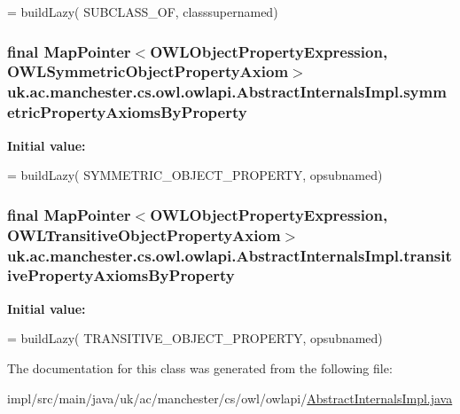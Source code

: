 \begin{DoxyCode}
= buildLazy(
            SUBCLASS\_OF, classsupernamed)
\end{DoxyCode}
\hypertarget{classuk_1_1ac_1_1manchester_1_1cs_1_1owl_1_1owlapi_1_1_abstract_internals_impl_a8a15718e35cef2f64037bd8c70ee3f4a}{
\subsubsection[{symmetric\-Property\-Axioms\-By\-Property}]{\setlength{\rightskip}{0pt plus 5cm}final Map\-Pointer$<${\bf O\-W\-L\-Object\-Property\-Expression}, {\bf O\-W\-L\-Symmetric\-Object\-Property\-Axiom}$>$ uk.\-ac.\-manchester.\-cs.\-owl.\-owlapi.\-Abstract\-Internals\-Impl.\-symmetric\-Property\-Axioms\-By\-Property\hspace{0.3cm}{\ttfamily [protected]}}}\label{classuk_1_1ac_1_1manchester_1_1cs_1_1owl_1_1owlapi_1_1_abstract_internals_impl_a8a15718e35cef2f64037bd8c70ee3f4a}
{\bfseries Initial value\-:}
\begin{DoxyCode}
= buildLazy(
            SYMMETRIC\_OBJECT\_PROPERTY, opsubnamed)
\end{DoxyCode}
\hypertarget{classuk_1_1ac_1_1manchester_1_1cs_1_1owl_1_1owlapi_1_1_abstract_internals_impl_a59538bd3e85bb3fb5433e47ed8e01a1a}{
\subsubsection[{transitive\-Property\-Axioms\-By\-Property}]{\setlength{\rightskip}{0pt plus 5cm}final Map\-Pointer$<${\bf O\-W\-L\-Object\-Property\-Expression}, {\bf O\-W\-L\-Transitive\-Object\-Property\-Axiom}$>$ uk.\-ac.\-manchester.\-cs.\-owl.\-owlapi.\-Abstract\-Internals\-Impl.\-transitive\-Property\-Axioms\-By\-Property\hspace{0.3cm}{\ttfamily [protected]}}}\label{classuk_1_1ac_1_1manchester_1_1cs_1_1owl_1_1owlapi_1_1_abstract_internals_impl_a59538bd3e85bb3fb5433e47ed8e01a1a}
{\bfseries Initial value\-:}
\begin{DoxyCode}
= buildLazy(
            TRANSITIVE\_OBJECT\_PROPERTY, opsubnamed)
\end{DoxyCode}


The documentation for this class was generated from the following file\-:\begin{DoxyCompactItemize}
\item 
impl/src/main/java/uk/ac/manchester/cs/owl/owlapi/\hyperlink{_abstract_internals_impl_8java}{Abstract\-Internals\-Impl.\-java}\end{DoxyCompactItemize}
